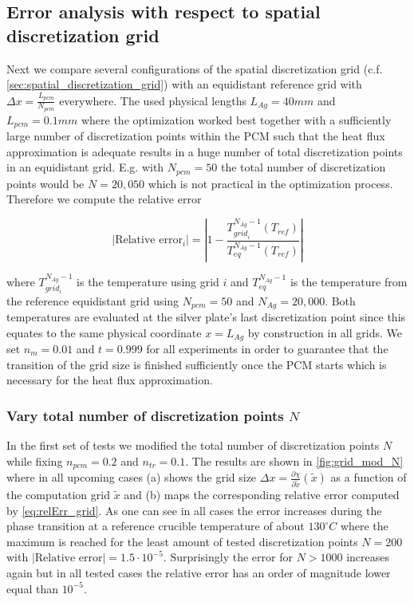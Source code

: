 \documentclass{scrartcl}[12pt, halfparskip]
\numberwithin{equation}{section}
\numberwithin{figure}{section}
\numberwithin{table}{section}
\begin{document}
\subsection{Error analysis with respect to spatial discretization grid}
Next we compare several configurations of the spatial discretization grid (c.f. \cref{sec:spatial_discretization_grid}) with an equidistant reference grid with $\Delta x = \frac{L_{pcm}}{N_{pcm}}$ everywhere. The used physical lengths $L_{Ag}=40mm$ and $L_{pcm}=0.1mm$ where the optimization worked best together with a sufficiently large number of discretization points within the PCM such that the heat flux approximation is adequate results in a huge number of total discretization points in an equidistant grid. E.g. with $N_{pcm}=50$ the total number of discretization points would be $N=20,050$ which is not practical in the optimization process. Therefore we compute the relative error

\begin{equation}
	| \text{Relative error}_i| = \left| 1 - \frac{T_{{grid}_i}^{N_{Ag}-1}(T_{ref})}{T_{eq}^{N_{Ag}-1}(T_{ref})} \right|
	\label{eq:relErr_grid}
\end{equation}

where $T_{grid_i}^{N_{Ag}-1}$ is the temperature using grid $i$ and $T_{eq}^{N_{Ag}-1}$ is the temperature from the reference equidistant grid using $N_{pcm}=50$ and $N_{Ag}=20,000$. Both temperatures are evaluated at the silver plate's last discretization point since this equates to the same physical coordinate $x=L_{Ag}$ by construction in all grids. 
We set $n_m=0.01$ and $t=0.999$ for all experiments in order to guarantee that the transition of the grid size is finished sufficiently once the PCM starts which is necessary for the heat flux approximation. \\

\subsubsection{Vary total number of discretization points $N$}
In the first set of tests we modified the total number of discretization points $N$ while fixing $n_{pcm}=0.2$ and $n_{tr}=0.1$. The results are shown in \cref{fig:grid_mod_N} where in all upcoming cases (a) shows the grid size $\Delta x = \frac{\partial \chi}{\partial \tilde{x}}(\tilde{x})$ as a function of the computation grid $\tilde{x}$ and (b) maps the corresponding relative error computed by \cref{eq:relErr_grid}. As one can see in all cases the error increases during the phase transition at a reference crucible temperature of about $130^{\circ} C$ where the maximum is reached for the least amount of tested discretization points $N=200$ with $|\text{Relative error|}=1.5 \cdot 10^{-5}$. Surprisingly the error for $N > 1000$ increases again but in all tested cases the relative error has an order of magnitude lower equal than $10^{-5}$. 
\end{document}
